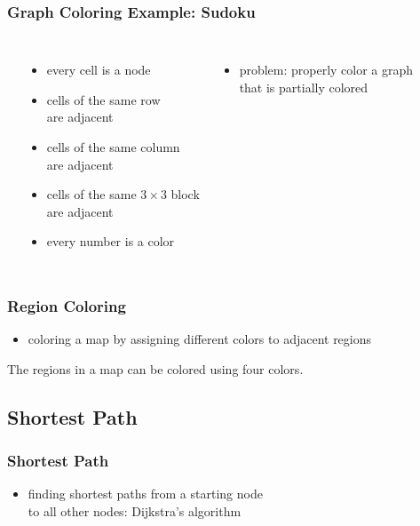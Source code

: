 \documentclass[dvipsnames]{beamer}
\begin{document}
\begin{frame}
  \frametitle{Graph Coloring Example: Sudoku}

  \begin{columns}[t]
    \begin{center}
    \end{center}

    \begin{itemize}
      \item every cell is a node
      \item cells of the same row\\
        are adjacent
      \item cells of the same column\\
        are adjacent
      \item cells of the same $3 \times 3$ block\\
        are adjacent
      \item every number is a color
    \end{itemize}

    \pause
    \begin{itemize}
      \item problem: properly color a graph\\
        that is partially colored
    \end{itemize}
  \end{columns}
\end{frame}

\begin{frame}
  \frametitle{Region Coloring}

  \begin{itemize}
    \item coloring a map by assigning different colors to adjacent regions
  \end{itemize}

  \medskip
  \begin{theorem}
    The regions in a map can be colored using four colors.
  \end{theorem}
\end{frame}

\subsection{Shortest Path}

\begin{frame}
  \frametitle{Shortest Path}

  \begin{itemize}
    \item finding shortest paths from a starting node\\
      to all other nodes:
      Dijkstra's algorithm
  \end{itemize}
\end{frame}
\end{document}
